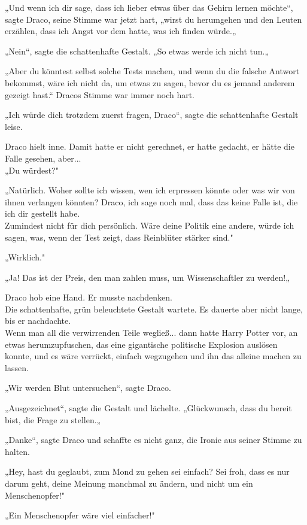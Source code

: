 {„Und wenn ich dir sage, dass ich lieber etwas über das Gehirn lernen möchte“, sagte Draco, seine Stimme war jetzt hart, „wirst du herumgehen und den Leuten erzählen, dass ich Angst vor dem hatte, was ich finden würde.„

„Nein“, sagte die schattenhafte Gestalt. „So etwas werde ich nicht tun.„

„Aber du könntest selbst solche Tests machen, und wenn du die falsche Antwort bekommst, wäre ich nicht da, um etwas zu sagen, bevor du es jemand anderem gezeigt hast.“ Dracos Stimme war immer noch hart.

„Ich würde dich trotzdem zuerst fragen, Draco“, sagte die schattenhafte Gestalt leise.

Draco hielt inne. Damit hatte er nicht gerechnet, er hatte gedacht, er hätte die Falle gesehen, aber...\\ „Du würdest?"

„Natürlich. Woher sollte ich wissen, wen ich erpressen könnte oder was wir von ihnen verlangen könnten? Draco, ich sage noch mal, dass das keine Falle ist, die ich dir gestellt habe.\\ Zumindest nicht für dich persönlich. Wäre deine Politik eine andere, würde ich sagen, was, wenn der Test zeigt, dass Reinblüter stärker sind."

„Wirklich."

„Ja! Das ist der Preis, den man zahlen muss, um Wissenschaftler zu werden!„

Draco hob eine Hand. Er musste nachdenken.\\ Die schattenhafte, grün beleuchtete Gestalt wartete. Es dauerte aber nicht lange, bis er nachdachte.\\ Wenn man all die verwirrenden Teile wegließ... dann hatte Harry Potter vor, an etwas herumzupfuschen, das eine gigantische politische Explosion auslösen konnte, und es wäre verrückt, einfach wegzugehen und ihn das alleine machen zu lassen.

„Wir werden Blut untersuchen“, sagte Draco.

„Ausgezeichnet“, sagte die Gestalt und lächelte. „Glückwunsch, dass du bereit bist, die Frage zu stellen.„

„Danke“, sagte Draco und schaffte es nicht ganz, die Ironie aus seiner Stimme zu halten.

„Hey, hast du geglaubt, zum Mond zu gehen sei einfach? Sei froh, dass es nur darum geht, deine Meinung manchmal zu ändern, und nicht um ein Menschenopfer!"

„Ein Menschenopfer wäre viel einfacher!"

}
